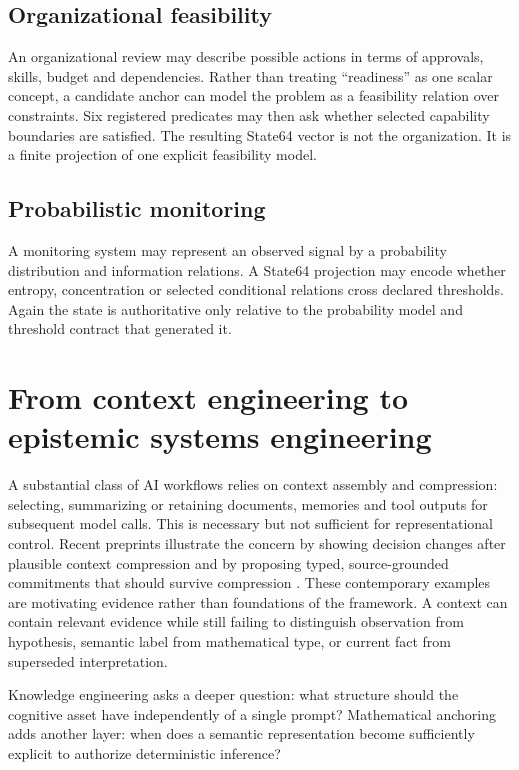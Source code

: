 \documentclass[11pt,a4paper]{article}
\begin{document}
\subsection{Organizational feasibility}
An organizational review may describe possible actions in terms of approvals, skills, budget and dependencies. Rather than treating ``readiness'' as one scalar concept, a candidate anchor can model the problem as a feasibility relation over constraints. Six registered predicates may then ask whether selected capability boundaries are satisfied. The resulting State64 vector is not the organization. It is a finite projection of one explicit feasibility model.

\subsection{Probabilistic monitoring}
A monitoring system may represent an observed signal by a probability distribution and information relations. A State64 projection may encode whether entropy, concentration or selected conditional relations cross declared thresholds. Again the state is authoritative only relative to the probability model and threshold contract that generated it.

\section{From context engineering to epistemic systems engineering}
A substantial class of AI workflows relies on context assembly and compression: selecting, summarizing or retaining documents, memories and tool outputs for subsequent model calls. This is necessary but not sufficient for representational control. Recent preprints illustrate the concern by showing decision changes after plausible context compression and by proposing typed, source-grounded commitments that should survive compression \cite{lee2026,trukhina2026}. These contemporary examples are motivating evidence rather than foundations of the framework. A context can contain relevant evidence while still failing to distinguish observation from hypothesis, semantic label from mathematical type, or current fact from superseded interpretation.

Knowledge engineering asks a deeper question: what structure should the cognitive asset have independently of a single prompt? Mathematical anchoring adds another layer: when does a semantic representation become sufficiently explicit to authorize deterministic inference?
\end{document}
